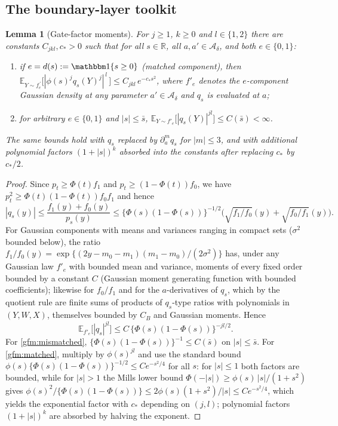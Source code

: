 \documentclass[11pt]{article}
\newtheorem{lemma}{Lemma}
\theoremstyle{definition}
\theoremstyle{plain}
\newcommand{\E}{\mathbb{E}}
\newcommand{\R}{\mathbb{R}}
\begin{document}
\subsection{The boundary-layer toolkit}

\begin{lemma}[Gate-factor moments]
\label{lem:gate_factor_moments}
For $j\ge1$, $k\ge0$ and $l\in\{1,2\}$ there are constants $C_{jkl},c_*>0$ such that for all $s\in\R$, all $a,a'\in\mathcal A_\delta$, and both $e\in\{0,1\}$:
\begin{enumerate}[label=(\roman*),nosep]
\item\label{gfm:matched} if $e=d(s):=\mathbbm 1\{s\ge0\}$ (matched component), then
$\E_{Y\sim f^{\,\prime}_{e}}\big[|\phi(s)^jq_s(Y)^j|^{\,l}\,\big]\le C_{jkl}\,e^{-c_*s^2}$,
where $f'_e$ denotes the $e$-component Gaussian density at any parameter $a'\in\mathcal A_\delta$ and $q_s$ is evaluated at $a$;
\item\label{gfm:mismatched} for arbitrary $e\in\{0,1\}$ and $|s|\le\bar s$,
$\E_{Y\sim f'_{e}}\big[|q_s(Y)|^{jl}\big]\le C(\bar s)<\infty$.
\end{enumerate}
The same bounds hold with $q_s$ replaced by $\partial_a^mq_s$ for $|m|\le3$, and with additional polynomial factors $(1+|s|)^k$ absorbed into the constants after replacing $c_*$ by $c_*/2$.
\end{lemma}

\begin{proof}
Since $p_t\ge\Phi(t)f_1$ and $p_t\ge(1-\Phi(t))f_0$, we have $p_t^2\ge\Phi(t)(1-\Phi(t))f_0f_1$ and hence
\[
|q_s(y)|\le\frac{f_1(y)+f_0(y)}{p_s(y)}\le
\big\{\Phi(s)(1-\Phi(s))\big\}^{-1/2}\Big(\sqrt{f_1/f_0}(y)+\sqrt{f_0/f_1}(y)\Big).
\]
For Gaussian components with means and variances ranging in compact sets ($\sigma^2$ bounded below), the ratio $f_1/f_0(y)=\exp\{(2y-m_0-m_1)(m_1-m_0)/(2\sigma^2)\}$ has, under any Gaussian law $f'_e$ with bounded mean and variance, moments of every fixed order bounded by a constant $C$ (Gaussian moment generating function with bounded coefficients); likewise for $f_0/f_1$ and for the $a$-derivatives of $q_s$, which by the quotient rule are finite sums of products of $q_s$-type ratios with polynomials in $(Y,W,X)$, themselves bounded by $C_B$ and Gaussian moments. Hence
\[
\E_{f'_e}\big[|q_s|^{jl}\big]\le C\,\{\Phi(s)(1-\Phi(s))\}^{-jl/2}.
\]
For \ref{gfm:mismatched}, $\{\Phi(s)(1-\Phi(s))\}^{-1}\le C(\bar s)$ on $|s|\le\bar s$. For \ref{gfm:matched}, multiply by $\phi(s)^{jl}$ and use the standard bound $\phi(s)\{\Phi(s)(1-\Phi(s))\}^{-1/2}\le C e^{-s^2/4}$ for all $s$: for $|s|\le1$ both factors are bounded, while for $|s|>1$ the Mills lower bound $\Phi(-|s|)\ge\phi(s)\,|s|/(1+s^2)$ gives $\phi(s)^2/\{\Phi(s)(1-\Phi(s))\}\le2\phi(s)(1+s^2)/|s|\le Ce^{-s^2/4}$, which yields the exponential factor with $c_*$ depending on $(j,l)$; polynomial factors $(1+|s|)^k$ are absorbed by halving the exponent.
\end{proof}
\end{document}
